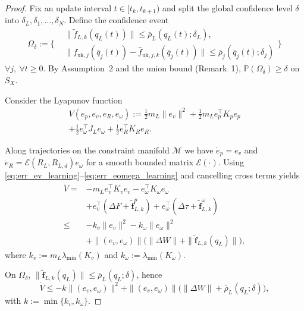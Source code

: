 \documentclass[10pt,a4paper]{amsart}
\begin{document}
\begin{proof}
Fix an update interval $t\in[t_k,t_{k+1})$ and split the global confidence level $\delta$
into $\delta_L,\delta_1,\dots,\delta_N$. Define the confidence event
\begin{equation}
\Omega_\delta :=
\Big\{
\begin{aligned}
&\|\tilde f_{L,k}(q_L(t))\|\le \bar\rho_L(q_L(t);\delta_L),\\
&\|f_{\mathrm{uk},j}(\bar q_j(t))-\hat f_{\mathrm{uk},j,k}(\bar q_j(t))\|
\le \bar\rho_j(\bar q_j(t);\delta_j)
\end{aligned}
\Big\} 
\label{eq:Omega_delta_union}
\end{equation}  $\forall j,\ \forall t\ge 0$. 
By Assumption~2 and the union bound (Remark~1), $\mathbb{P}(\Omega_\delta)\ge \delta$ on $S_X$.

Consider the Lyapunov function
\begin{align*}
V(e_p,e_v,e_R,e_\omega)
:= \tfrac12 m_L\|e_v\|^2 + \tfrac12 m_L e_p^\top K_p e_p\\
+ \tfrac12 e_\omega^\top J_L e_\omega + \tfrac12 e_R^\top K_R e_R .\end{align*}

Along trajectories on the constraint manifold $\mathcal M$ we have
$\dot e_p=e_v$ and $\dot e_R=\mathcal E(R_L,R_{L,d})e_\omega$ for a smooth bounded matrix
$\mathcal E(\cdot)$. Using \eqref{eq:err_ev_learning}--\eqref{eq:err_eomega_learning} and cancelling cross terms yields
\begin{equation}
\label{eq:Vdot_bound_38}
\begin{aligned}
\dot V
=& -m_L e_v^\top K_v e_v - e_\omega^\top K_\omega e_\omega
\\&+ e_v^\top(\Delta F+\tilde{\mathbf f}^p_{L,k})
+ e_\omega^\top(\Delta\tau+\tilde{\mathbf f}^\omega_{L,k})\\
\le &-k_v\|e_v\|^2 - k_\omega\|e_\omega\|^2\\
&+ \|(e_v,e_\omega)\|\Big(\|\Delta W\|+\|\tilde{\mathbf f}_{L,k}(q_L)\|\Big),
\end{aligned}
\end{equation}
where $k_v:=m_L\lambda_{\min}(K_v)$ and $k_\omega:=\lambda_{\min}(K_\omega)$.

On $\Omega_\delta$, $\|\tilde{\mathbf f}_{L,k}(q_L)\|\le \bar\rho_L(q_L;\delta)$, hence
\begin{equation}
\label{eq:Vdot_bound_k}
\dot V \le -k\|(e_v,e_\omega)\|^2
+ \|(e_v,e_\omega)\|\Big(\|\Delta W\|+\bar\rho_L(q_L;\delta)\Big),
\end{equation}
with $k:=\min\{k_v,k_\omega\}$.



\end{proof}
\end{document}
